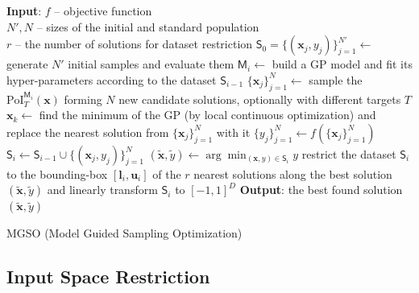 \documentclass{itatnew}
\newcommand{\xx}{\mathrm{\mathbf{x}}}
\begin{document}
\begin{algorithm}[t]
\begin{algorithmic}[1]
{\small
  \STATE \textbf{Input}: $f$ -- objective function \\
      \quad $N', N$ -- sizes of the initial and standard population \\
      \quad $r$ -- the number of solutions for dataset restriction
  \STATE $\mathsf{S}_0 = \{(\xx_j, y_j)\}_{j=1}^{N'} \leftarrow$ generate $N'$ initial samples 
      and evaluate them %
    \STATE $\mathsf{M}_i \leftarrow$ build a GP model and fit its hyper-parameters
        according to the dataset $\mathsf{S}_{i-1}$
    \STATE $\{\xx_j\}_{j=1}^{N}  \leftarrow$ sample the $\textrm{PoI}_T^{\mathsf{M}_i}(\xx)$ 
        forming $N$ new candidate solutions, optionally with different targets $T$
    \STATE $\xx_k \leftarrow$ find the minimum of the GP (by local continuous optimization) and replace the nearest solution from $\{\xx_j\}_{j=1}^{N}$ with it
    \STATE $\{y_j\}_{j=1}^N \leftarrow f(\{\xx_j\}_{j=1}^N)$  \hspace{\fill}   
    \STATE $\mathsf{S}_i \leftarrow \mathsf{S}_{i-1} \cup \{(\xx_j, y_j)\}_{j=1}^N$  \hspace{\fill}   
    \STATE $(\tilde{\xx}, \tilde{y}) \leftarrow \arg \min_{(\xx,y) \in \mathsf{S}_i} y$  \hspace{\fill}  
    \STATE restrict the dataset $\mathsf{S}_i$ to the bounding-box $[\mathbf{l}_i,\mathbf{u}_i]$ of the $r$ nearest solutions along the best solution $(\tilde{\xx},\tilde{y})$ and linearly transform $\mathsf{S}_i$ to $[-1, 1]^D$
    \ENDIF
  \ENDWHILE
  \STATE \textbf{Output}: the best found solution $(\tilde{\xx}, \tilde{y})$
}
\end{algorithmic}
\caption{MGSO (Model Guided Sampling Optimization)}
\label{alg:mgso}
\end{algorithm}


\subsection{Input Space Restriction}
\end{document}
